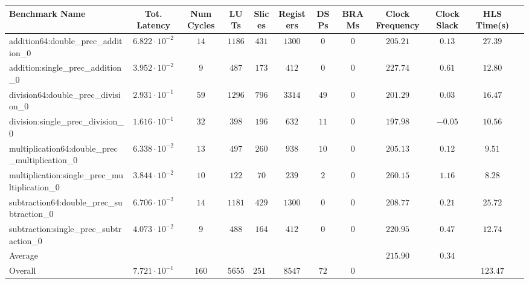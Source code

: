 \begin{tabular}{|l|c|c|c|c|c|c|c|c|c|c|c|}
\hline
Benchmark Name                                   & Tot. Latency            & Num Cycles & LUTs     & Slices   & Registers & DSPs   & BRAMs & Clock Frequency & Clock Slack & HLS Time(s) \\
\hline
addition64:double\_prec\_addition\_0             & $ 6.822 \cdot 10^{-2} $ & $ 14     $ & $ 1186 $ & $ 431  $ & $ 1300  $ & $ 0  $ & $ 0 $ & $ 205.21      $ & $ 0.13    $ & $ 27.39   $ \\
addition:single\_prec\_addition\_0               & $ 3.952 \cdot 10^{-2} $ & $ 9      $ & $ 487  $ & $ 173  $ & $ 412   $ & $ 0  $ & $ 0 $ & $ 227.74      $ & $ 0.61    $ & $ 12.80   $ \\
division64:double\_prec\_division\_0             & $ 2.931 \cdot 10^{-1} $ & $ 59     $ & $ 1296 $ & $ 796  $ & $ 3314  $ & $ 49 $ & $ 0 $ & $ 201.29      $ & $ 0.03    $ & $ 16.47   $ \\
division:single\_prec\_division\_0               & $ 1.616 \cdot 10^{-1} $ & $ 32     $ & $ 398  $ & $ 196  $ & $ 632   $ & $ 11 $ & $ 0 $ & $ 197.98      $ & $ -0.05   $ & $ 10.56   $ \\
multiplication64:double\_prec\_multiplication\_0 & $ 6.338 \cdot 10^{-2} $ & $ 13     $ & $ 497  $ & $ 260  $ & $ 938   $ & $ 10 $ & $ 0 $ & $ 205.13      $ & $ 0.12    $ & $ 9.51    $ \\
multiplication:single\_prec\_multiplication\_0   & $ 3.844 \cdot 10^{-2} $ & $ 10     $ & $ 122  $ & $ 70   $ & $ 239   $ & $ 2  $ & $ 0 $ & $ 260.15      $ & $ 1.16    $ & $ 8.28    $ \\
subtraction64:double\_prec\_subtraction\_0       & $ 6.706 \cdot 10^{-2} $ & $ 14     $ & $ 1181 $ & $ 429  $ & $ 1300  $ & $ 0  $ & $ 0 $ & $ 208.77      $ & $ 0.21    $ & $ 25.72   $ \\
subtraction:single\_prec\_subtraction\_0         & $ 4.073 \cdot 10^{-2} $ & $ 9      $ & $ 488  $ & $ 164  $ & $ 412   $ & $ 0  $ & $ 0 $ & $ 220.95      $ & $ 0.47    $ & $ 12.74   $ \\
\hline
Average                                          & $                     $ & $        $ & $      $ & $      $ & $       $ & $    $ & $   $ & $ 215.90      $ & $ 0.34    $ & $         $ \\
\hline
Overall                                          & $ 7.721 \cdot 10^{-1} $ & $ 160    $ & $ 5655 $ & $ 2519 $ & $ 8547  $ & $ 72 $ & $ 0 $ & $             $ & $         $ & $ 123.47  $ \\
\hline
\end{tabular}
